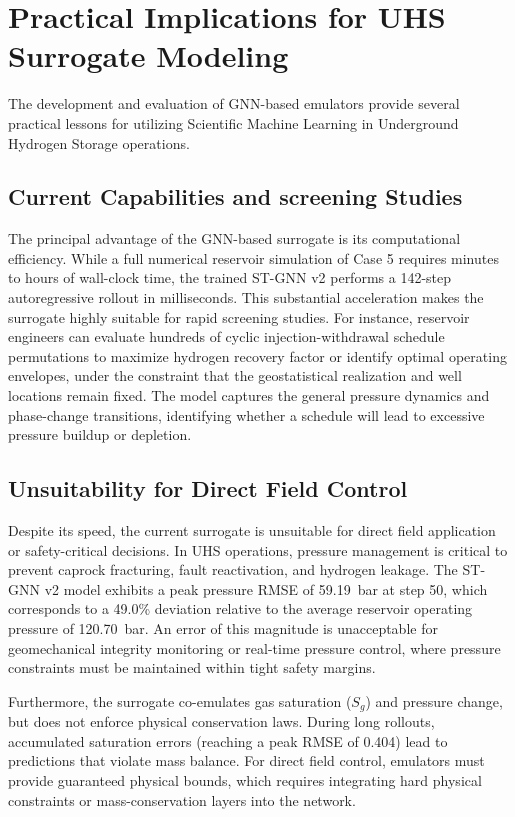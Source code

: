 \section{Practical Implications for UHS Surrogate Modeling}
The development and evaluation of GNN-based emulators provide several practical lessons for utilizing Scientific Machine Learning in Underground Hydrogen Storage operations.

\subsection{Current Capabilities and screening Studies}
The principal advantage of the GNN-based surrogate is its computational efficiency. While a full numerical reservoir simulation of Case 5 requires minutes to hours of wall-clock time, the trained ST-GNN v2 performs a 142-step autoregressive rollout in milliseconds. This substantial acceleration makes the surrogate highly suitable for rapid screening studies. For instance, reservoir engineers can evaluate hundreds of cyclic injection-withdrawal schedule permutations to maximize hydrogen recovery factor or identify optimal operating envelopes, under the constraint that the geostatistical realization and well locations remain fixed. The model captures the general pressure dynamics and phase-change transitions, identifying whether a schedule will lead to excessive pressure buildup or depletion.

\subsection{Unsuitability for Direct Field Control}
Despite its speed, the current surrogate is unsuitable for direct field application or safety-critical decisions. In UHS operations, pressure management is critical to prevent caprock fracturing, fault reactivation, and hydrogen leakage. The ST-GNN v2 model exhibits a peak pressure RMSE of 59.19~bar at step 50, which corresponds to a 49.0\% deviation relative to the average reservoir operating pressure of 120.70~bar. An error of this magnitude is unacceptable for geomechanical integrity monitoring or real-time pressure control, where pressure constraints must be maintained within tight safety margins.

Furthermore, the surrogate co-emulates gas saturation ($S_g$) and pressure change, but does not enforce physical conservation laws. During long rollouts, accumulated saturation errors (reaching a peak RMSE of 0.404) lead to predictions that violate mass balance. For direct field control, emulators must provide guaranteed physical bounds, which requires integrating hard physical constraints or mass-conservation layers into the network.

